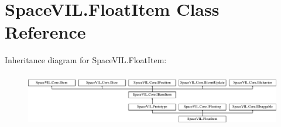 \hypertarget{class_space_v_i_l_1_1_float_item}{}\section{Space\+V\+I\+L.\+Float\+Item Class Reference}
\label{class_space_v_i_l_1_1_float_item}
Inheritance diagram for Space\+V\+I\+L.\+Float\+Item\+:\begin{figure}[H]
\begin{center}
\leavevmode
\includegraphics[height=2.421622cm]{class_space_v_i_l_1_1_float_item}
\end{center}
\end{figure}
